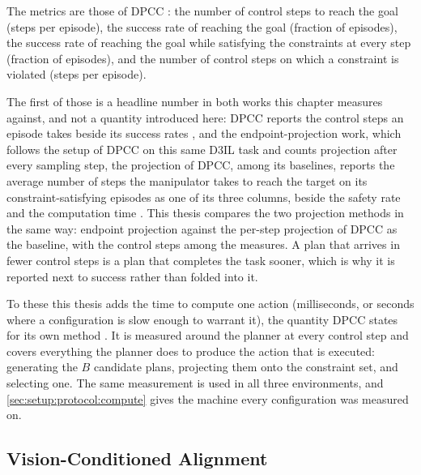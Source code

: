 The metrics are those of \ac{DPCC} \parencite[Sec.~6.1]{romer2025diffusion}: the number of control
steps to reach the goal (steps per episode), the success rate of reaching the goal (fraction of episodes),
the success rate of reaching the goal while satisfying the constraints at every step (fraction of
episodes), and the number of control steps on which a constraint is violated (steps per episode).

The first of those is a headline number in both works this chapter measures against, and not a
quantity introduced here: \ac{DPCC} reports the control steps an episode takes beside its success
rates \parencite[Sec.~6.1]{romer2025diffusion}, and the endpoint-projection work, which follows the setup of
\ac{DPCC} on this same D3IL task and counts projection after every sampling step, the projection of \ac{DPCC},
among its baselines, reports the average number of steps the manipulator takes to reach the target on its
constraint-satisfying episodes as one of its three columns, beside the safety rate and the computation time
\parencite[Sec.~VII-A, Table~II]{li2025hardflow}. This thesis compares the two projection methods in the same
way: endpoint projection against the per-step projection of \ac{DPCC} as the baseline, with the control steps
among the measures. A plan that arrives in
fewer control steps is a plan that completes the task sooner, which is why it is reported next to
success rather than folded into it.

To these this thesis adds the time to compute one action (milliseconds, or seconds where a
configuration is slow enough to warrant it), the quantity \ac{DPCC} states for its own
method \parencite[Sec.~6]{romer2025diffusion}. It is measured around the planner at every control step
and covers everything the planner does to produce the action that is executed: generating the $B$
candidate plans, projecting them onto the constraint set, and selecting one. The same measurement is
used in all three environments, and
\autoref{sec:setup:protocol:compute} gives the machine every configuration was measured on.

\subsection{Vision-Conditioned Alignment}\label{sec:setup:metrics:aligning}

